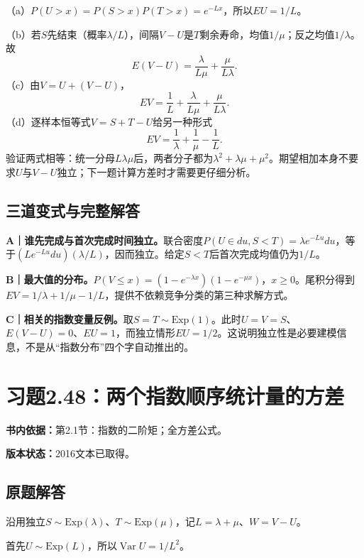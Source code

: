 \documentclass[
  11pt,
  a4paper,
  UTF8,fontset=fandol]{ctexart}
\let\OldSection\section
\renewcommand{\section}{\Needspace{7\baselineskip}\OldSection}
\let\OldSubsection\subsection
\renewcommand{\subsection}{\Needspace{5\baselineskip}\OldSubsection}
\begin{document}
（a）\(P(U>x)=P(S>x)P(T>x)=e^{-Lx}\)，所以\(\boxed{EU=1/L}\)。

（b）若\(S\)先结束（概率\(\lambda/L\)），间隔\(V-U\)是\(T\)剩余寿命，均值\(1/\mu\)；反之均值\(1/\lambda\)。故
\[\boxed{E(V-U)=\frac\lambda{L\mu}+\frac\mu{L\lambda}.}\]
（c）由\(V=U+(V-U)\)，
\[\boxed{EV=\frac1L+\frac\lambda{L\mu}+\frac\mu{L\lambda}.}\]
（d）逐样本恒等式\(V=S+T-U\)给另一种形式
\[EV=\frac1\lambda+\frac1\mu-\frac1L.\]
验证两式相等：统一分母\(L\lambda\mu\)后，两者分子都为\(\lambda^2+\lambda\mu+\mu^2\)。期望相加本身不要求\(U\)与\(V-U\)独立；下一题计算方差时才需要更仔细分析。

\subsection{三道变式与完整解答}\label{ux4e09ux9053ux53d8ux5f0fux4e0eux5b8cux6574ux89e3ux7b54-46}

\textbf{A｜谁先完成与首次完成时间独立。}联合密度\(P(U\in du,S<T)=\lambda e^{-Lu}du\)，等于\((Le^{-Lu}du)(\lambda/L)\)，因而独立。给定\(S<T\)后首次完成均值仍为\(1/L\)。

\textbf{B｜最大值的分布。}\(P(V\le x)=(1-e^{-\lambda x})(1-e^{-\mu x})\)，\(x\ge0\)。尾积分得到\(EV=1/\lambda+1/\mu-1/L\)，提供不依赖竞争分类的第三种求解方式。

\textbf{C｜相关的指数变量反例。}取\(S=T\sim\mathrm{Exp}(1)\)。此时\(U=V=S\)、\(E(V-U)=0\)、\(EU=1\)，而独立情形\(EU=1/2\)。这说明独立性是必要建模信息，不是从``指数分布''四个字自动推出的。

\newpage

\section{习题2.48：两个指数顺序统计量的方差}\label{ux4e60ux98982.48ux4e24ux4e2aux6307ux6570ux987aux5e8fux7edfux8ba1ux91cfux7684ux65b9ux5dee}

\textbf{书内依据：}第2.1节：指数的二阶矩；全方差公式。

\textbf{版本状态：}2016文本已取得。

\subsection{原题解答}\label{ux539fux9898ux89e3ux7b54-47}

沿用独立\(S\sim\mathrm{Exp}(\lambda)\)、\(T\sim\mathrm{Exp}(\mu)\)，记\(L=\lambda+\mu\)、\(W=V-U\)。

首先\(U\sim\mathrm{Exp}(L)\)，所以\(\boxed{\operatorname{Var}U=1/L^2}\)。
\end{document}
